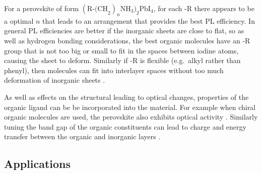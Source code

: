 For a perovskite of form $(\textrm{R-(CH}_2)_n\textrm{NH}_3)_2\textrm{PbI}_4$, for each -R there appears to be a optimal $n$ that leads to an arrangement that provides the best PL efficiency. In general PL efficiencies are better if the inorganic sheets are close to flat, so as well as hydrogen bonding considerations, the best organic molecules have an -R group that is not too big or small to fit in the spaces between iodine atoms, causing the sheet to deform. Similarly if -R is flexible (e.g.\ alkyl rather than phenyl), then molecules can fit into interlayer spaces without too much deformation of inorganic sheets \cite{Zhang2009}.

As well as effects on the structural leading to optical changes, properties of the organic ligand can be be incorporated into the material. For example when chiral organic molecules are used, the perovskite also exhibits optical activity \cite{Teshima2003}. Similarly tuning the band gap of the organic constituents can lead to charge and energy transfer between the organic and inorganic layers \cite{Kawabata2009, Mitzi1999a, Braun1999}.

\subsection{Applications}
